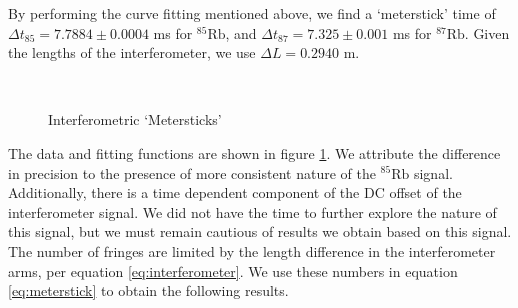 \documentclass[12pt]{article}
\begin{document}
By performing the curve fitting mentioned above, we find a `meterstick' time of $\Delta t_{85} = 7.7884\pm 0.0004$ ms for ${}^{85}\text{Rb}$, and $\Delta t_{87} = 7.325\pm 0.001$ ms for ${}^{87}\text{Rb}$.  Given the lengths of the interferometer, we use $\Delta L = 0.2940$ m.

\begin{figure}%
	\centering
	\,
	\caption{Interferometric `Metersticks'}%
	\label{fig:meterstick}%
\end{figure}

The data and fitting functions are shown in figure \ref{fig:meterstick}.  We attribute the difference in precision to the presence of more consistent nature of the ${}^{85}\text{Rb}$ signal.  Additionally, there is a time dependent component of the DC offset of the interferometer signal.  We did not have the time to further explore the nature of this signal, but we must remain cautious of results we obtain based on this signal.  The number of fringes are limited by the length difference in the interferometer arms, per equation \ref{eq:interferometer}.  We use these numbers in equation \ref{eq:meterstick} to obtain the following results.
\end{document}
